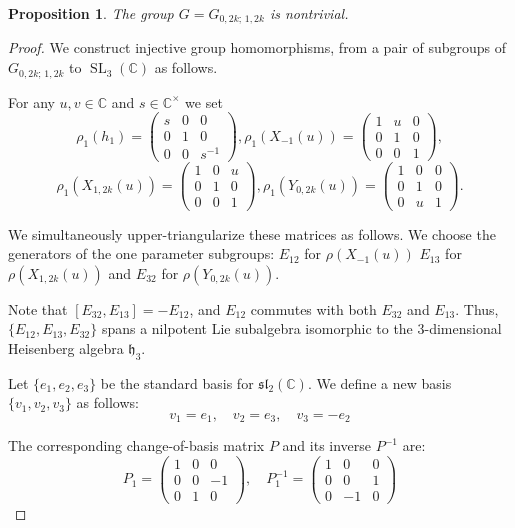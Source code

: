\documentclass[10pt,a4paper]{amsart}
\newtheorem{proposition}{Proposition}
\newcommand{\C}{{\mathbb C}}
\DeclareMathOperator{\SL}{SL}
\begin{document}
 {\color{blue} \begin{proposition}\label{nontriv}
The group $G = G_{0,2k;\,1,2k}$ is nontrivial.
\end{proposition}

\begin{proof} We construct  injective group homomorphisms,   from a pair of subgroups of $ G_{0,2k;\,1,2k}$ to $\SL_3(\mathbb{C})$ as follows. 

For any $u, v \in \mathbb{C}$ and $s \in \mathbb{C}^{\times}$ we set
$$\rho_1(h_1)=\begin{pmatrix} 
s & 0 & 0 \\ 
0 & 1 & 0 \\ 
0 & 0 & s^{-1} \end{pmatrix}, 
\rho_1(X_{-1}(u)) = \begin{pmatrix} 1 & u & 0 \\ 0 & 1 & 0 \\ 0 & 0 & 1 \end{pmatrix}, $$
$$
\rho_1(X_{1,2k}(u)) = \begin{pmatrix} 1 & 0 & u \\ 0 & 1 & 0 \\ 0 & 0 & 1 \end{pmatrix}, \rho_1(Y_{0,2k}(u)) = \begin{pmatrix} 1 & 0 & 0 \\ 0 & 1 & 0 \\ 0 & u & 1 \end{pmatrix}.$$

We simultaneously upper-triangularize these  matrices as follows. We choose the generators of the one parameter subgroups:
$E_{12}$ for $\rho(X_{-1}(u))$
$E_{13}$ for $\rho(X_{1,2k}(u))$ and 
$E_{32}$ for $\rho(Y_{0,2k}(u))$.


Note that $[E_{32}, E_{13}] = -E_{12}$, and $E_{12}$ commutes with both $E_{32}$ and $E_{13}$. Thus, $\{E_{12}, E_{13}, E_{32}\}$ spans a nilpotent Lie subalgebra isomorphic to the 3-dimensional Heisenberg algebra $\mathfrak{h}_3$. 


Let $\{e_1, e_2, e_3\}$ be the standard basis for $\mathfrak{sl}_2(\C)$. We define a new basis $\{v_1, v_2, v_3\}$ as follows:
\[
v_1 = e_1, \quad v_2 = e_3, \quad v_3 = -e_2
\]


The corresponding change-of-basis matrix $P$  and its inverse $P^{-1}$ are:
\[
P_1 = \begin{pmatrix} 1 & 0 & 0 \\ 0 & 0 & -1 \\ 0 & 1 & 0 \end{pmatrix}, \quad P_1^{-1} = \begin{pmatrix} 1 & 0 & 0 \\ 0 & 0 & 1 \\ 0 & -1 & 0 \end{pmatrix}
\]




\end{proof}}
\end{document}
